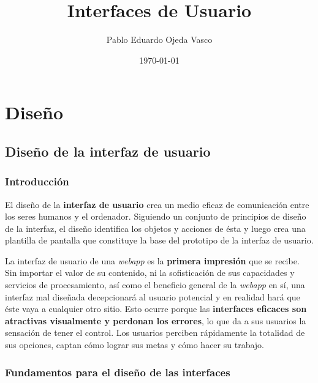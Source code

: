 \documentclass[a4paper,oneside,11pt]{book}
\begin{document}
\title{Interfaces de Usuario}
\author{Pablo Eduardo Ojeda Vasco}
\date{\today}



	\maketitle
%
%
\chapter{Diseño} %
	\label{sec:diseno}

	\section{Diseño de la interfaz de usuario} %
	\label{sec:interfaz_usuario}
	
	\subsection{Introducción} %
		\label{sub:iu_introduccion}
	
	El diseño de la \textbf{interfaz de usuario} crea un medio eficaz de comunicación entre los seres humanos y el ordenador. Siguiendo un conjunto de principios de diseño de la interfaz, el diseño identifica los objetos y acciones de ésta y luego crea una plantilla de pantalla que constituye la base del prototipo de la interfaz de usuario.
	
	La interfaz de usuario de una \textit{webapp} es la \textbf{primera impresión} que se recibe. Sin importar el valor de su contenido, ni la sofisticación de sus capacidades y servicios de procesamiento, así como el beneficio general de la \textit{webapp} en sí, una interfaz mal diseñada decepcionará al usuario potencial y en realidad hará que éste vaya a cualquier otro sitio. Esto ocurre porque las \textbf{interfaces eficaces son atractivas visualmente y perdonan los errores}, lo que da a sus usuarios la sensación de tener el control. Los usuarios perciben rápidamente la totalidad de sus opciones, captan cómo lograr sus metas y cómo hacer su trabajo.
	
	
	\subsection{Fundamentos para el diseño de las interfaces} %
	\label{sub:iu_fundamentos}
	
\end{document}
